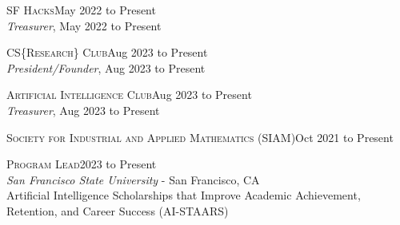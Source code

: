\documentclass[hidelinks, 10pt]{article}
\begin{document}
{\begin{minipage}[ct]{0.9\linewidth}
\vspace{1.5mm}

\textsc{SF Hacks}\hfill May 2022 to Present\\
\emph{Treasurer}, May 2022 to Present

\vspace{1.5mm}

\textsc{CS\{Research\} Club}\hfill Aug 2023 to Present\\
\emph{President/Founder}, Aug 2023 to Present

\vspace{1.5mm}

\textsc{Artificial Intelligence Club}\hfill Aug 2023 to Present\\
\emph{Treasurer}, Aug 2023 to Present

\vspace{1.5mm}

\textsc{Society for Industrial and Applied Mathematics} (SIAM)\hfill Oct 2021 to Present\\
\end{minipage}

\vspace{4mm}
\pagebreak



\hrulefill

\vspace{4mm}

\begin{minipage}[ct]{0.9\linewidth}
\textsc{Program Lead}\hfill 2023 to Present\\
{\emph{San Francisco State University} - San Francisco, CA}\\
Artificial Intelligence Scholarships that Improve Academic Achievement, Retention, and Career Success (AI-STAARS)
\end{minipage}

\vspace{2.5mm}

}
\end{document}
